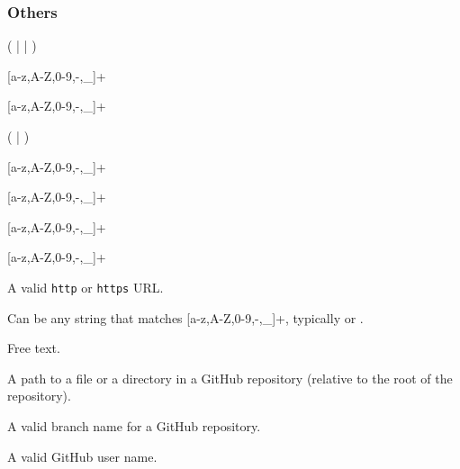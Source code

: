 \subsubsection{Others}

\bigskip
\noindent
{}

(  |  |  )

\bigskip
\noindent
{}

[a-z,A-Z,0-9,-,\_]+

\bigskip
\noindent
{}

[a-z,A-Z,0-9,-,\_]+

\bigskip
\noindent
{}

(  |  )

\bigskip
\noindent
{}

[a-z,A-Z,0-9,-,\_]+

\bigskip
\noindent
{}

[a-z,A-Z,0-9,-,\_]+

\bigskip
\noindent
{}

[a-z,A-Z,0-9,-,\_]+

\bigskip
\noindent
{}

[a-z,A-Z,0-9,-,\_]+

\bigskip
\noindent
{}

A valid \texttt{http} or \texttt{https} URL.

\bigskip
\noindent
{}

Can be any string that matches [a-z,A-Z,0-9,-,\_]+, typically
\lst{-} or \lst{--}.

\bigskip
\noindent
{}

Free text.

\bigskip
\noindent
{}

A path to a file or a directory in a GitHub repository (relative to
the root of the repository).

\bigskip
\noindent
{}

A valid branch name for a GitHub repository.

\bigskip
\noindent
{}

A valid GitHub user name.

\bigskip
\noindent
{}


